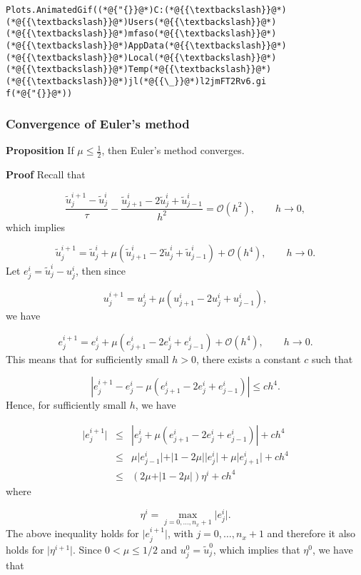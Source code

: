 \documentclass[12pt,a4paper]{article}
\begin{document}
\begin{lstlisting}
Plots.AnimatedGif((*@{"{}}@*)C:(*@{{\textbackslash}}@*)(*@{{\textbackslash}}@*)Users(*@{{\textbackslash}}@*)(*@{{\textbackslash}}@*)mfaso(*@{{\textbackslash}}@*)(*@{{\textbackslash}}@*)AppData(*@{{\textbackslash}}@*)(*@{{\textbackslash}}@*)Local(*@{{\textbackslash}}@*)(*@{{\textbackslash}}@*)Temp(*@{{\textbackslash}}@*)(*@{{\textbackslash}}@*)jl(*@{{\_}}@*)l2jmFT2Rv6.gi
f(*@{"{}}@*))
\end{lstlisting}


\subsubsection{Convergence of Euler's method}
\textbf{Proposition} If $\mu \leq \frac{1}{2}$, then Euler's method converges.

\textbf{Proof} Recall that

\[
\frac{\tilde{u}^{i+1}_j - \tilde{u}^i_j}{\tau} - \frac{\tilde{u}^{i}_{j+1} - 2\tilde{u}^i_j + \tilde{u}^i_{j-1}}{h^2}  =  \mathcal{O}(h^2), \qquad h \to 0,
\]
which implies

\[
\tilde{u}^{i+1}_j = \tilde{u}^i_j + \mu \left(\tilde{u}^{i}_{j+1} - 2\tilde{u}^i_j + \tilde{u}^i_{j-1}\right)  +  \mathcal{O}(h^4), \qquad h \to 0.
\]
Let $e^i_j = \tilde{u}^i_j - u^i_j$, then since

\[
u^{i+1}_j = u^i_j + \mu \left( u^{i}_{j+1} - 2u^i_j + u^i_{j-1}  \right),
\]
we have

\[
e^{i+1}_j = e^i_j + \mu \left( e^{i}_{j+1} - 2e^i_j + e^i_{j-1}  \right) + \mathcal{O}(h^4), \qquad h \to 0.
\]
This means that for sufficiently small $h > 0$, there exists a constant $c$ such that 

\[
\left\vert e^{i+1}_j -  e^i_j - \mu \left( e^{i}_{j+1} - 2e^i_j + e^i_{j-1}  \right) \right\vert  \leq ch^4.
\]
Hence, for sufficiently small $h$, we have


\begin{eqnarray*}
\vert e^{i+1}_j \vert &\leq& \left\vert e^i_j + \mu ( e^{i}_{j+1} - 2e^i_j + e^i_{j-1} ) \right\vert + ch^4\\
 & \leq & \mu \vert e^i_{j-1} \vert + \vert 1 - 2\mu \vert \vert e^i_{j} \vert  + \mu \vert e^i_{j+1} \vert + ch^4  \\
 & \leq & \left(2\mu  + \vert 1 - 2\mu \vert \right) \eta^i  + ch^4  
\end{eqnarray*}
where 

\[
\eta^{i} = \max_{j = 0, \ldots, n_x+1}\vert e^i_j \vert.
\]
The above inequality holds for $\vert e^{i+1}_j \vert$, with $j = 0, \ldots, n_x+1$ and therefore it also holds for $\vert  \eta^{i+1} \vert$. Since $0 < \mu \leq 1/2$ and $u^0_j = \tilde{u}^0_j$, which implies that $\eta^0$, we have that
\end{document}
